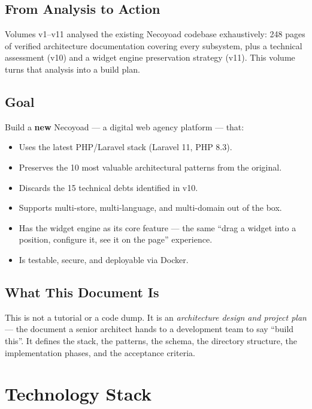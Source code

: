 \documentclass[11pt,a4paper]{article}
\begin{document}
\subsection{From Analysis to Action}

Volumes v1--v11 analysed the existing Necoyoad codebase exhaustively:
248 pages of verified architecture documentation covering every
subsystem, plus a technical assessment (v10) and a widget engine
preservation strategy (v11). This volume turns that analysis into a
build plan.

\subsection{Goal}

Build a \textbf{new} Necoyoad --- a digital web agency platform ---
that:
\begin{itemize}[leftmargin=1.6em,itemsep=2pt]
  \item Uses the latest PHP/Laravel stack (Laravel 11, PHP 8.3).
  \item Preserves the 10 most valuable architectural patterns from the
        original.
  \item Discards the 15 technical debts identified in v10.
  \item Supports multi-store, multi-language, and multi-domain out of
        the box.
  \item Has the widget engine as its core feature --- the same
        ``drag a widget into a position, configure it, see it on the
        page'' experience.
  \item Is testable, secure, and deployable via Docker.
\end{itemize}

\subsection{What This Document Is}

This is not a tutorial or a code dump. It is an \emph{architecture
design and project plan} --- the document a senior architect hands to
a development team to say ``build this''. It defines the stack, the
patterns, the schema, the directory structure, the implementation
phases, and the acceptance criteria.

\section{Technology Stack}\label{sec:stack}
\end{document}
